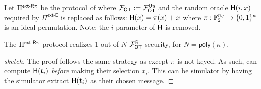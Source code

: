 \begin{definition}\label{def:ext_S_R}
	Let $\Pi^{\textsf{ext-\ensuremath{\mathsf{R}}}\pi}$ be the protocol of  where $\mathcal{F}_{\mathsf{OT}}:=\mathcal{F}_{\mathsf{OT}}^{\mathsf{U} u}$ and the random oracle $\mathsf{H}(i,x)$ required by $\Pi^{\textsf{ext-E}}$ is replaced as follows: $\mathsf{H}(x)=\pi(x)+x$ where $\pi: \mathbb{F}^{{n_\mathcal{C}}}_2 \rightarrow\{0,1\}^\kappa$ is an ideal permutation. Note: the $i$ parameter of $\mathsf{H}$ is removed.
\end{definition}
\begin{lemma}\label{lem:ext_S_R}
	The $\Pi^{\textsf{ext-\ensuremath{\mathsf{R}}}\pi}$ protocol realizes 1-out-of-$N$ $\mathcal{F}_{\mathsf{OT}}^\mathsf{R}$-security, for $N=\textsf{poly}(\kappa)$.
\end{lemma}
\begin{proof}[sketch]
	The proof follows the same strategy as  except $\pi$ is not keyed. As such, \rec can compute $\mathsf{H}(\boldsymbol{t}_i)$ \emph{before} making their selection $x_i$. This can be simulator by having the simulator extract $\mathsf{H}(\boldsymbol{t}_i)$ as their chosen message. 
\end{proof}

\fi